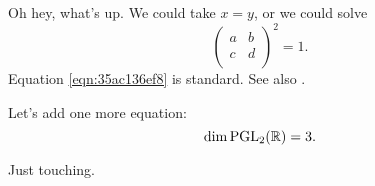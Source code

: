 \documentclass[reqno]{amsart} 
\begin{document}
Oh hey, what's up.  We could take $x = y$, or we could solve
\begin{equation}\label{eqn:35ac136ef8}
  \begin{pmatrix}
    a & b \\
    c & d \\
  \end{pmatrix}^2 = 1.
\end{equation}
Equation \eqref{eqn:35ac136ef8} is standard.  See also \cite{2021arXiv210915230N}.

Let's add one more equation:
\begin{equation*}
\dim \operatorname{PGL}_2(\mathbb{R}) = 3.
\end{equation*}

Just touching.



{} 
\end{document}
